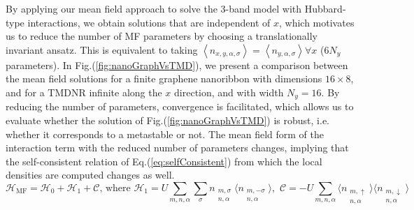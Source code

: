 By applying our mean field approach to solve the 3-band model with Hubbard-type interactions, we obtain solutions that are independent of $x$, which motivates us to reduce the number of MF parameters by choosing a translationally invariant ansatz.
This is equivalent to taking $\left\langle n_{x, y,\alpha, \sigma}\right\rangle = \left\langle n_{y,\alpha, \sigma}\right\rangle  \forall x$ ($6 N_y$ parameters).
In Fig.(\ref{fig:nanoGraphVsTMD}), we present a comparison between the mean field solutions for a finite graphene nanoribbon with dimensions $16 \times 8$, and for a \ac{TMDNR} infinite along the $x$ direction, and with width $N_y = 16$.
By reducing the number of parameters, convergence is facilitated, which allows us to evaluate whether the solution of Fig.(\ref{fig:nanoGraphVsTMD}) is robust, i.e. whether it corresponds to a metastable or not.
The mean field form of the interaction term with the reduced number of parameters changes, implying that the self-consistent relation of Eq.(\ref{eq:selfConsistent}) from which the local densities are computed changes as well.
\begin{equation}
\mathcal{H}_{\text{MF}} = \mathcal{H}_0 + \mathcal{H}_1 + \mathcal{C} , \,\text{where} \,\, \mathcal{H}_1 = U \sum_{m, n, \alpha}  \sum_\sigma n_{\substack{m, \sigma \\ n, \alpha}} \big\langle n_{\substack{m, -\sigma \\ n, \alpha}} \big\rangle  , \,\, \mathcal{C} = -U  \sum_{m, n, \alpha} \big\langle n_{\substack{m, \uparrow \\ n, \alpha}} \big\rangle \big\langle n_{\substack{m, \downarrow \\ n, \alpha}} \big\rangle
\end{equation}
